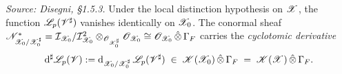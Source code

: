 \begin{definition}
  \label{def:CyclotomicDerivative}
  \textit{Source: Disegni, §1.5.3.}
  Under the local distinction hypothesis on $\mathscr{X}$, the function
  $\mathscr{L}_p(\mathscr{V}^\sharp)$ vanishes identically on $\mathscr{X}_0$.  The conormal
  sheaf
  $\mathscr{N}^*_{\mathscr{X}_0/\mathscr{X}_0^\sharp} = \mathcal{I}_{\mathscr{X}_0}/\mathcal{I}_{\mathscr{X}_0}^2
  \otimes_{\mathscr{O}_{\mathscr{X}_0^\sharp}} \mathscr{O}_{\mathscr{X}_0} \cong \mathscr{O}_{\mathscr{X}_0}
  \,\hat\otimes\, \Gamma_F$
  carries the \emph{cyclotomic derivative}
  \[
    \mathrm{d}^\sharp\mathscr{L}_p(\mathscr{V}) :=
    \mathrm{d}_{\mathscr{X}_0/\mathscr{X}_0^\sharp}\,\mathscr{L}_p(\mathscr{V}^\sharp)
    \;\in\; \mathscr{K}(\mathscr{X}_0)\,\hat\otimes\,\Gamma_F
    \;=\; \mathscr{K}(\mathscr{X})\,\hat\otimes\,\Gamma_F.
  \]
\end{definition}


